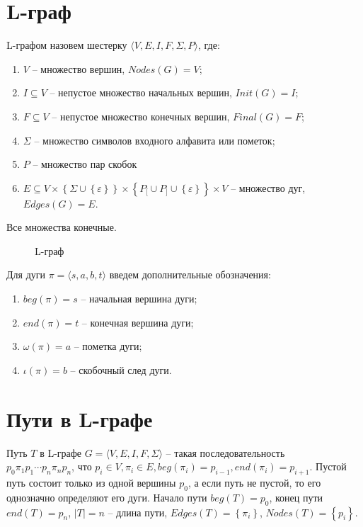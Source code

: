 \section{L-граф}
L-графом назовем шестерку $\langle V,E,I,F,\Sigma,P\rangle$, где:
\begin{enumerate}[label=\arabic*)]
    \item $V$ -- множество вершин, $Nodes(G) = V$;
    \item $I \subseteq V$ -- непустое множество начальных вершин, $Init(G) = I$;
    \item $F \subseteq V$ -- непустое множество конечных вершин, $Final(G) = F$;
    \item $\Sigma$ -- множество символов входного алфавита или пометок;
    \item $P$ -- множество пар скобок
    \item $E \subseteq V 
                    \times \left\{ \Sigma \cup \left\{ \varepsilon \right\}\right\} 
                    \times \left\{ P_[ \cup P_] \cup \left\{ \varepsilon \right\} \right\} 
                    \times V $
        -- множество дуг, $Edges(G) = E$.
\end{enumerate}
Все множества конечные.

\begin{figure}
    \centering
    
    \caption{L-граф}
    \label{lgraph1-expample-image}
    
\end{figure}

Для дуги $\pi = \langle s, a, b, t \rangle$ введем дополнительные обозначения:
\begin{enumerate}[label=\arabic*)]
    \item $beg(\pi) = s$ -- начальная вершина дуги;
    \item $end(\pi) = t$ -- конечная вершина дуги;
    \item $\omega(\pi) = a$ -- пометка дуги;
    \item $\iota(\pi) = b$ -- скобочный след дуги.
\end{enumerate}

\section{Пути в L-графе}
Путь $T$ в L-графе $G=\langle V,E,I,F,\Sigma\rangle$ -- такая последовательность \\ 
$p_0 \pi_1 p_1 \cdots p_n \pi_n p_n$, что 
$p_i \in V, \pi_i \in E, beg(\pi_i) = p_{i-1}, end(\pi_i) = p_{i+1}$.
Пустой путь состоит только из одной вершины $p_0$, а если путь не пустой, то его однозначно определяют его дуги.
Начало пути $beg(T) = p_0$, конец пути $end(T) = p_n$, $\left| T \right| = n$ -- длина пути, 
$Edges(T) = \left\{ \pi_i \right\}$, $Nodes(T) = \left\{ p_i \right\}$.

